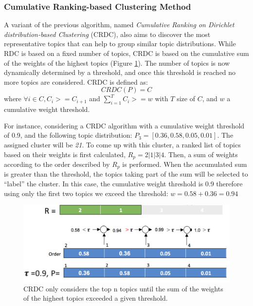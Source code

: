 \subsubsection{Cumulative Ranking-based Clustering Method}

A variant of the previous algorithm, named \textit{Cumulative Ranking on Dirichlet distribution-based Clustering} (CRDC), also aims to discover the most representative topics that can help to group similar topic distributions. While RDC is based on a fixed number of topics, CRDC is based on the cumulative sum of the weights of the highest topics (Figure \ref{fig:crdc-cluster}). The number of topics is now dynamically determined by a threshold, and once this threshold is reached no more topics are considered. CRDC is defined as:
\begin{equation}
CRDC(P)=C
\end{equation}
where  $\forall i \in C, C_i >=C_{i+1}$ and $\sum\limits_{i=1}^T C_i >= w$ with $T$ size of $C$, and $w$ a cumulative weight threshold.


For instance, considering a CRDC algorithm with a cumulative weight threshold of 0.9, and the following topic distribution: $P_3=[0.36, 0.58, 0.05, 0.01]$. The assigned cluster will be \textit{21}. To come up with this cluster, a ranked list of topics based on their weights is first calculated, $R_p=2|1|3|4$. Then, a sum of weights according to the order described by $R_p$ is performed. When the accumulated sum is greater than the threshold, the topics taking part of the sum will be selected to ``label'' the cluster. In this case, the cumulative weight threshold is 0.9 therefore using only the first two topics we exceed the threshold: $w=0.58+0.36=0.94$

\begin{figure}
  \centering
  \includegraphics[scale=0.33]{crdc-cluster.png}
  \caption{CRDC only considers the top n topics until the sum of the weights of the highest topics exceeded a given threshold.}
  \label{fig:crdc-cluster}
\end{figure}


